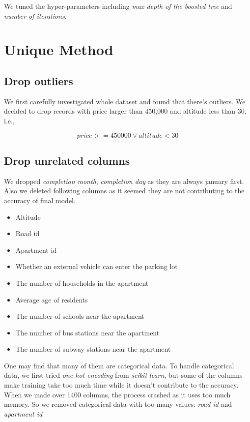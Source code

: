 \documentclass{article}
\begin{document}
We tuned the hyper-parameters including \textit{max depth of the boosted tree} and \textit{number of iterations}.

\section{Unique Method}


\subsection{Drop outliers}
We first carefully investigated whole dataset and found that there's outliers. We decided to drop records with price larger than 450,000 and altitude less than 30, i.e.,

$$ price >= 450000 \lor altitude < 30 $$

\subsection{Drop unrelated columns}
We dropped \textit{completion month}, \textit{completion day} as they are always january first. Also we deleted following columns as it seemed they are not contributing to the accuracy of final model.

\begin{itemize}
	\item Altitude
	\item Road id
	\item Apartment id
	\item Whether an external vehicle can enter the parking lot
	\item The number of households in the apartment
	\item Average age of residents
	\item The number of schools near the apartment
	\item The number of bus stations near the apartment
	\item The number of subway stations near the apartment
\end{itemize}

One may find that many of them are categorical data. To handle categorical data, we first tried \textit{one-hot encoding} from \textit{scikit-learn}, but some of the columns make training take too much time while it doesn't contribute to the accuracy. When we made over 1400 columns, the process crashed as it uses too much memory. So we removed categorical data with too many values: \textit{road id} and \textit{apartment id}
\end{document}
